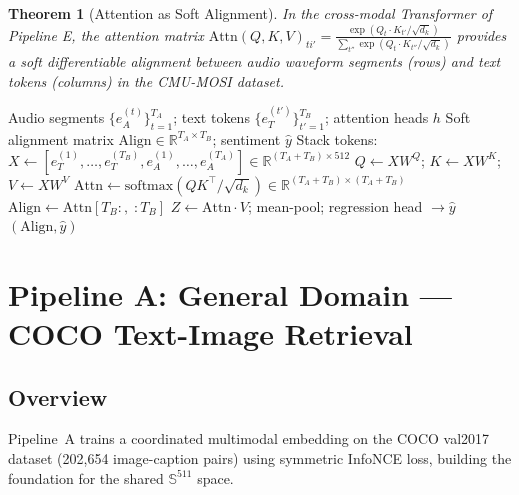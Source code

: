 \documentclass[12pt,a4paper]{article}
\theoremstyle{definition}
\theoremstyle{plain}
\newtheorem{theorem}{Theorem}[section]
\theoremstyle{remark}
\newcommand{\R}{\mathbb{R}}
\newcommand{\Sph}{\mathbb{S}}
\newcommand{\softmax}{\mathrm{softmax}}
\begin{document}
\begin{theorem}[Attention as Soft Alignment]
In the cross-modal Transformer of Pipeline E, the attention matrix $\text{Attn}(Q, K, V)_{ti'} = \frac{\exp(Q_t \cdot K_{t'}/\sqrt{d_k})}{\sum_{t''}\exp(Q_t \cdot K_{t''}/\sqrt{d_k})}$ provides a soft differentiable alignment between audio waveform segments (rows) and text tokens (columns) in the CMU-MOSI dataset.
\end{theorem}

\begin{algorithm}[H]
\caption{Challenge 5 --- Temporal Alignment via Cross-Modal Attention (CMU-MOSI)}
\label{alg:alignment_challenge}
\begin{algorithmic}[1]
\Require Audio segments $\{e_A^{(t)}\}_{t=1}^{T_A}$; text tokens $\{e_T^{(t')}\}_{t'=1}^{T_B}$; attention heads $h$
\Ensure Soft alignment matrix $\text{Align} \in \R^{T_A \times T_B}$; sentiment $\hat{y}$
\State Stack tokens: $X \gets [e_T^{(1)},\ldots,e_T^{(T_B)}, e_A^{(1)},\ldots,e_A^{(T_A)}] \in \R^{(T_A+T_B) \times 512}$
\State $Q \gets XW^Q$; $K \gets XW^K$; $V \gets XW^V$ 
\State $\text{Attn} \gets \softmax(QK^\top / \sqrt{d_k}) \in \R^{(T_A+T_B) \times (T_A+T_B)}$
\State $\text{Align} \gets \text{Attn}[T_B{:},\; :T_B]$ 
\State {}
\State $Z \gets \text{Attn} \cdot V$; mean-pool; regression head $\to \hat{y}$
\State \Return $(\text{Align}, \hat{y})$
\end{algorithmic}
\end{algorithm}

\newpage
\section{Pipeline A: General Domain --- COCO Text-Image Retrieval}
\label{sec:pipelineA}

\subsection{Overview}

Pipeline~A trains a coordinated multimodal embedding on the COCO val2017 dataset (202,654 image-caption pairs) using symmetric InfoNCE loss, building the foundation for the shared $\Sph^{511}$ space.
\end{document}
